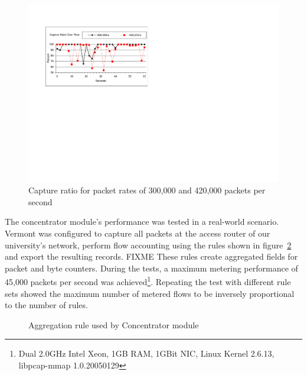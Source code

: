 \begin{figure}
\begin{center}
\includegraphics[scale=0.7]{gfx/sampler-perf3.pdf}
\caption{Capture ratio for packet rates of 300,000 and 420,000 packets per second}
\label{fig_perf_sampler}
\end{center}
\end{figure}

The concentrator module's performance was tested in a real-world scenario.
Vermont was configured to capture all packets at the access router of our university's network, perform flow accounting using the rules shown in figure~\ref{fig_rule} and export the resulting records.
FIXME These rules create aggregated fields for packet and byte counters.
During the tests, a maximum metering performance of 45,000 packets per second was achieved\footnote{Dual 2.0GHz Intel Xeon, 1GB RAM, 1GBit NIC, Linux Kernel 2.6.13, libpcap-mmap 1.0.20050129}. 
Repeating the test with different rule sets showed the maximum number of metered flows to be inversely proportional to the number of rules.

\begin{figure}
\centering
{}
\caption{Aggregation rule used by Concentrator module}
\label{fig_rule}
\end{figure}


